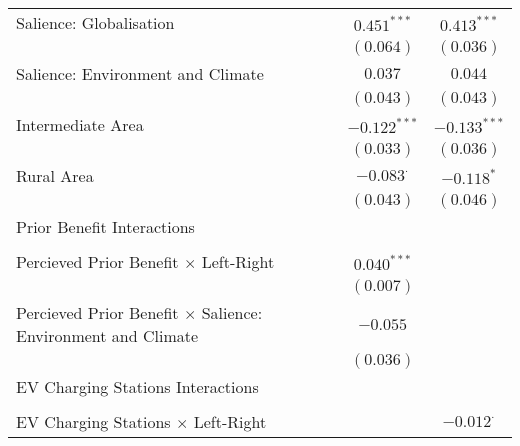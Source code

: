 \begin{center}
\begin{tiny}
\begin{longtable}{l@{} c@{} c@{}}
\quad Salience: Globalisation                                            & $0.451^{***}$    & $0.413^{***}$    \\
                                                                         & $(0.064)$        & $(0.036)$        \\
\quad Salience: Environment and Climate                                  & $0.037$          & $0.044$          \\
                                                                         & $(0.043)$        & $(0.043)$        \\
\quad Intermediate Area                                                  & $-0.122^{***}$   & $-0.133^{***}$   \\
                                                                         & $(0.033)$        & $(0.036)$        \\
\quad Rural Area                                                         & $-0.083^{\cdot}$ & $-0.118^{*}$     \\
                                                                         & $(0.043)$        & $(0.046)$        \\
Prior Benefit Interactions                                               &                  &                  \\
                                                                         &                  &                  \\
\quad Percieved Prior Benefit $\times$ Left-Right                        & $0.040^{***}$    &                  \\
                                                                         & $(0.007)$        &                  \\
\quad Percieved Prior Benefit $\times$ Salience: Environment and Climate & $-0.055$         &                  \\
                                                                         & $(0.036)$        &                  \\
EV Charging Stations Interactions                                        &                  &                  \\
                                                                         &                  &                  \\
\quad EV Charging Stations $\times$ Left-Right                           &                  & $-0.012^{\cdot}$ \\

\end{longtable}
\end{tiny}
\end{center}
